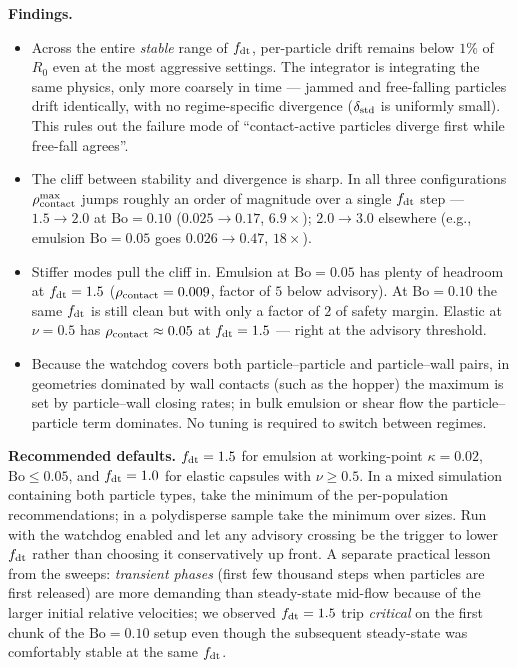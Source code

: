 \documentclass[aps,pre,twocolumn,floatfix,longbibliography]{revtex4-2}
\begin{document}
\textbf{Findings.}
\begin{itemize}
\item Across the entire \emph{stable} range of $f_{\rm dt}$, per-particle
  drift remains below $1\%$ of $R_0$ even at the most aggressive
  settings.  The integrator is integrating the same physics, only
  more coarsely in time --- jammed and free-falling particles drift
  identically, with no regime-specific divergence ($\delta_{\rm std}$
  is uniformly small).  This rules out the failure mode of
  ``contact-active particles diverge first while free-fall agrees''.
\item The cliff between stability and divergence is sharp.  In all
  three configurations $\rho_{\rm contact}^{\max}$ jumps roughly an
  order of magnitude over a single $f_{\rm dt}$ step --- $1.5 \to 2.0$
  at $\mathrm{Bo} = 0.10$ ($0.025 \to 0.17$, $6.9\times$); $2.0 \to
  3.0$ elsewhere (e.g., emulsion $\mathrm{Bo} = 0.05$ goes
  $0.026 \to 0.47$, $18\times$).
\item Stiffer modes pull the cliff in.  Emulsion at $\mathrm{Bo} = 0.05$
  has plenty of headroom at $f_{\rm dt} = 1.5$ ($\rho_{\rm contact}
  = 0.009$, factor of $5$ below advisory).  At $\mathrm{Bo} = 0.10$ the
  same $f_{\rm dt}$ is still clean but with only a factor of $2$ of
  safety margin.  Elastic at $\nu = 0.5$ has $\rho_{\rm contact}
  \approx 0.05$ at $f_{\rm dt} = 1.5$ --- right at the advisory
  threshold.
\item Because the watchdog covers both particle--particle and
  particle--wall pairs, in geometries dominated by wall contacts
  (such as the hopper) the maximum is set by particle--wall closing
  rates; in bulk emulsion or shear flow the particle--particle term
  dominates.  No tuning is required to switch between regimes.
\end{itemize}

\textbf{Recommended defaults.}  $f_{\rm dt} = 1.5$ for emulsion at
working-point $\kappa = 0.02$, $\mathrm{Bo} \leq 0.05$, and
$f_{\rm dt} = 1.0$ for elastic capsules with $\nu \geq 0.5$.  In a
mixed simulation containing both particle types, take the minimum of
the per-population recommendations; in a polydisperse sample take the
minimum over sizes.  Run with the watchdog enabled and let any
advisory crossing be the trigger to lower $f_{\rm dt}$ rather than
choosing it conservatively up front.  A separate practical lesson from
the sweeps: \emph{transient phases} (first few thousand steps when
particles are first released) are more demanding than steady-state
mid-flow because of the larger initial relative velocities; we
observed $f_{\rm dt} = 1.5$ trip \emph{critical} on the first chunk of
the $\mathrm{Bo} = 0.10$ setup even though the subsequent steady-state
was comfortably stable at the same $f_{\rm dt}$.
\end{document}
